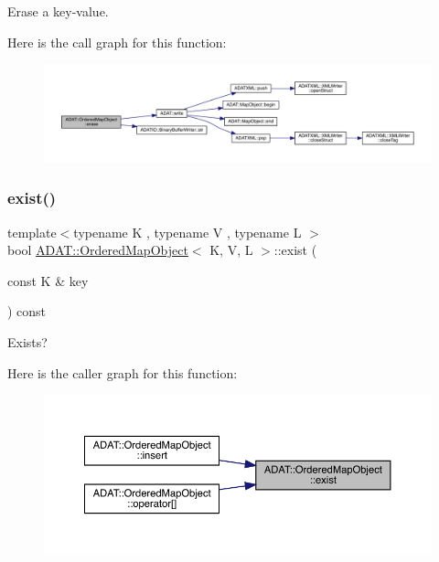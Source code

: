 Erase a key-\/value. 

Here is the call graph for this function\+:\nopagebreak
\begin{figure}[H]
\begin{center}
\leavevmode
\includegraphics[width=350pt]{db/d8c/classADAT_1_1OrderedMapObject_af5d9aad7f7a1ce462dfed9cbe13c638c_cgraph}
\end{center}
\end{figure}
\mbox{\label{classADAT_1_1OrderedMapObject_a1300311ab06f03aba77a5911d0017caf}} 
\subsubsection{\texorpdfstring{exist()}{exist()}}
{\footnotesize\ttfamily template$<$typename K , typename V , typename L $>$ \\
bool \mbox{\hyperlink{classADAT_1_1OrderedMapObject}{A\+D\+A\+T\+::\+Ordered\+Map\+Object}}$<$ K, V, L $>$\+::exist (\begin{DoxyParamCaption}\item[{const K \&}]{key }\end{DoxyParamCaption}) const\hspace{0.3cm}{\ttfamily [inline]}}



Exists? 

Here is the caller graph for this function\+:\nopagebreak
\begin{figure}[H]
\begin{center}
\leavevmode
\includegraphics[width=350pt]{db/d8c/classADAT_1_1OrderedMapObject_a1300311ab06f03aba77a5911d0017caf_icgraph}
\end{center}
\end{figure}
\mbox{\label{classADAT_1_1OrderedMapObject_a6466cef0224cef7a1e943b32da6e3410}} 
